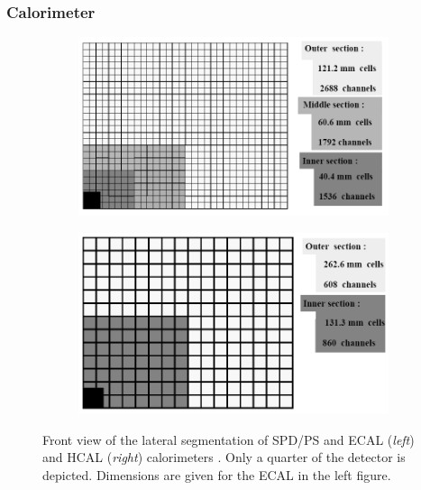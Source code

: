 \subsubsection{Calorimeter}
\begin{figure}[t]
	\centering
	\begin{subfigure}{.45\textwidth}
		\includegraphics[width=\textwidth]{graphics/02-lhcb/ecal_segm.png}
		\caption{}
		\label{fig:2:ecal_segm}
	\end{subfigure}
	\begin{subfigure}{.45\textwidth}
		\includegraphics[width=\textwidth]{graphics/02-lhcb/hcal_segm.png}
		\caption{}
		\label{fig:2:hcal_segm}
	\end{subfigure}
	\caption[Front view of the lateral segmentation of SPD/PS, ECAL and HCAL calorimeters.]{Front view of the lateral segmentation of SPD/PS and ECAL (\textit{left}) and HCAL (\textit{right}) calorimeters \cite{Alves:1129809}. Only a quarter of the detector is depicted. Dimensions are given for the ECAL in the left figure.}
	\label{fig:2:ecal_hcal_segm}
\end{figure}

